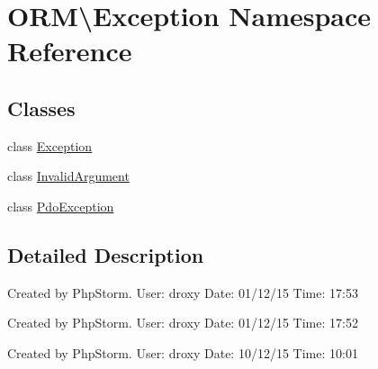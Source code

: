 \hypertarget{namespaceORM_1_1Exception}{}\section{O\+RM\textbackslash{}Exception Namespace Reference}
\label{namespaceORM_1_1Exception}
\subsection*{Classes}
\begin{DoxyCompactItemize}
\item 
class \hyperlink{classORM_1_1Exception_1_1Exception}{Exception}
\item 
class \hyperlink{classORM_1_1Exception_1_1InvalidArgument}{Invalid\+Argument}
\item 
class \hyperlink{classORM_1_1Exception_1_1PdoException}{Pdo\+Exception}
\end{DoxyCompactItemize}


\subsection{Detailed Description}
Created by Php\+Storm. User\+: droxy Date\+: 01/12/15 Time\+: 17\+:53

Created by Php\+Storm. User\+: droxy Date\+: 01/12/15 Time\+: 17\+:52

Created by Php\+Storm. User\+: droxy Date\+: 10/12/15 Time\+: 10\+:01 